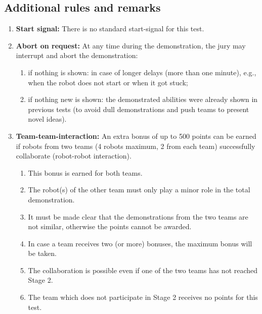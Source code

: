 \subsection{Additional rules and remarks}
\begin{enumerate}
	\item \textbf{Start signal:} There is no standard start-signal for this test.
	\item \textbf{Abort on request:} At any time during the demonstration, the jury may interrupt and abort the demonstration:
	\begin{enumerate}
		\item if nothing is shown: in case of longer delays (more than one minute), e.g., when the robot does not start or when it got stuck;
		\item if nothing new is shown: the demonstrated abilities were already shown in previous tests (to avoid dull demonstrations and push teams to present novel ideas).
	\end{enumerate}

	\item \textbf{Team-team-interaction:}  An extra bonus of up to 500 points can be earned if robots from two teams (4 robots maximum, 2 from each team) successfully collaborate (robot-robot interaction).
	\begin{enumerate}
		\item This bonus is earned for both teams.
		\item The robot(s) of the other team must only play a minor role in the total demonstration.
		\item It must be made clear that the demonstrations from the two teams are not similar, otherwise the points cannot be awarded.
		\item In case a team receives two (or more) bonuses, the maximum bonus will be taken.
		\item The collaboration is possible even if one of the two teams has not reached Stage 2.
		\item The team which does not participate in Stage 2 receives no points for this test.
	\end{enumerate}
\end{enumerate}
